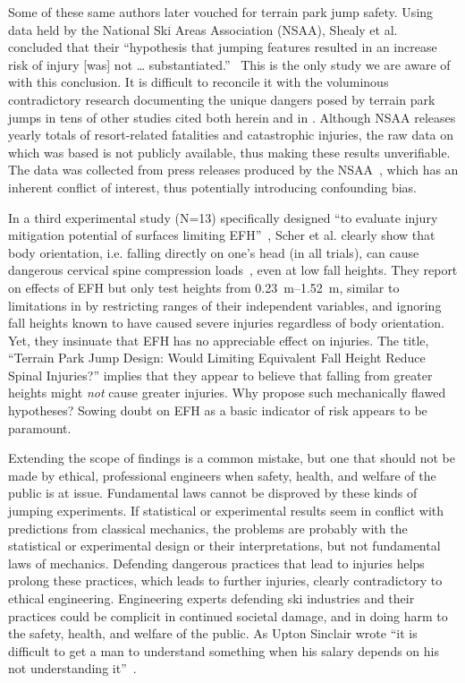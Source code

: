 \documentclass{article}
\begin{document}
Some of these same authors later vouched for terrain park jump safety. Using
data held by the National Ski Areas Association (NSAA), Shealy et
al.~\cite{Shealy2015} concluded that their ``hypothesis that jumping features
resulted in an increase risk of injury [was] not \ldots
substantiated.''~\cite{Shealy2015} This is the only study we are aware of with
this conclusion. It is difficult to reconcile it with the voluminous
contradictory research documenting the unique dangers posed by terrain park
jumps in tens of other studies cited both herein and in
\cite{Hubbard2009,Swedberg2012,McNeil2012,McNeil2012a,Hubbard2015,Levy2015,Petrone2017,Moore2018}.
Although NSAA releases yearly totals of resort-related fatalities and
catastrophic injuries, the raw data on which \cite{Shealy2015} was based is not
publicly available, thus making these results unverifiable. The data was
collected from press releases produced by the NSAA~\cite{Shealy2015}, which has
an inherent conflict of interest, thus potentially introducing confounding
bias.

In a third experimental study (N=13) specifically designed ``to evaluate injury
mitigation potential of surfaces limiting EFH''~\cite{Scher2015}, Scher et al.
clearly show that body orientation, i.e. falling directly on one's head (in all
trials), can cause dangerous cervical spine compression loads~\cite{Scher2015},
even at low fall heights. They report on effects of EFH but only test heights
from \SIrange{0.23}{1.52}{\meter},  similar to limitations in \cite{Shealy2010}
by restricting ranges of their independent variables, and ignoring fall heights
known to have caused severe injuries regardless of body orientation. Yet, they
insinuate that EFH has no appreciable effect on injuries.  The title, ``Terrain
Park Jump Design: Would Limiting Equivalent Fall Height Reduce Spinal
Injuries?'' implies that they appear to believe that falling from greater
heights might \emph{not} cause greater injuries. Why propose such mechanically
flawed hypotheses? Sowing doubt on EFH as a basic indicator of risk appears to
be paramount.

Extending the scope of findings is a common mistake, but one that should not be
made by ethical, professional engineers when safety, health, and welfare of the
public is at issue. Fundamental laws cannot be disproved by these kinds of
jumping experiments. If statistical or experimental results seem in conflict
with predictions from classical mechanics, the problems are probably with the
statistical or experimental design or their interpretations, but not
fundamental laws of mechanics. Defending dangerous practices that lead to
injuries helps prolong these practices, which leads to further injuries,
clearly contradictory to ethical engineering. Engineering experts defending ski
industries and their practices could be complicit in continued societal damage,
and in doing harm to the safety, health, and welfare of the public. As Upton
Sinclair wrote ``it is difficult to get a man to understand something when his
salary depends on his not understanding it''~\cite{Sinclair1994}.
\end{document}

